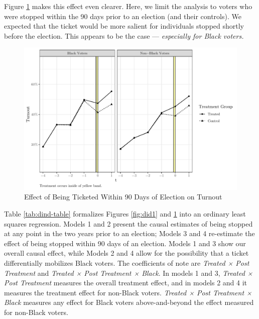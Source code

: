 \documentclass[
  12pt,
]{article}
\begin{document}
Figure \ref{fig:did2} makes this effect even clearer. Here, we limit the analysis to voters who were stopped within the 90 days prior to an election (and their controls). We expected that the ticket would be more salient for individuals stopped shortly before the election. This appears to be the case --- \emph{especially for Black voters.}

\begin{figure}[H]

{\centering \includegraphics{draft_paper_files/figure-latex/did2-1} 

}

\caption{\label{fig:did-2}Effect of Being Ticketed Within 90 Days of Election on Turnout}\label{fig:did2}
\end{figure}

Table \ref{tab:dind-table} formalizes Figures \ref{fig:did1} and \ref{fig:did2} into an ordinary least squares regression. Models 1 and 2 present the causal estimates of being stopped at any point in the two years prior to an election; Models 3 and 4 re-estimate the effect of being stopped within 90 days of an election. Models 1 and 3 show our overall causal effect, while Models 2 and 4 allow for the possibility that a ticket differentially mobilizes Black voters. The coefficients of note are \emph{Treated × Post Treatment} and \emph{Treated × Post Treatment × Black}. In models 1 and 3, \emph{Treated × Post Treatment} measures the overall treatment effect, and in models 2 and 4 it measures the treatment effect for non-Black voters. \emph{Treated × Post Treatment × Black} measures any effect for Black voters above-and-beyond the effect measured for non-Black voters.

\begin{singlespace}

\end{singlespace}
\end{document}
